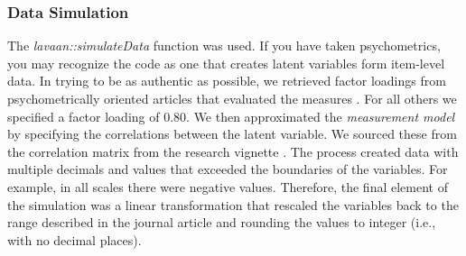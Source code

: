 \documentclass[
  11pt,
]{book}
\begin{document}
\hypertarget{data-simulation-3}{%
\subsubsection{Data Simulation}\label{data-simulation-3}}

The \emph{lavaan::simulateData} function was used. If you have taken psychometrics, you may recognize the code as one that creates latent variables form item-level data. In trying to be as authentic as possible, we retrieved factor loadings from psychometrically oriented articles that evaluated the measures \citep{nadal_racial_2011, veit_structure_1983}. For all others we specified a factor loading of 0.80. We then approximated the \emph{measurement model} by specifying the correlations between the latent variable. We sourced these from the correlation matrix from the research vignette \citep{lewis_applying_2017}. The process created data with multiple decimals and values that exceeded the boundaries of the variables. For example, in all scales there were negative values. Therefore, the final element of the simulation was a linear transformation that rescaled the variables back to the range described in the journal article and rounding the values to integer (i.e., with no decimal places).
\end{document}
